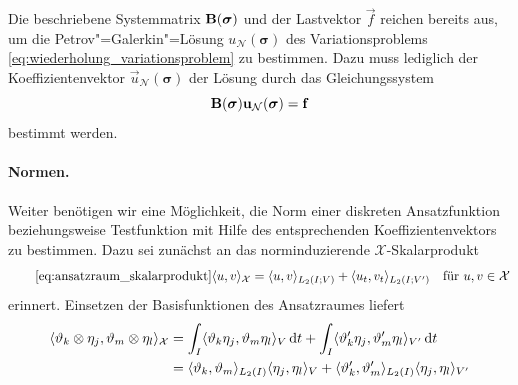 \documentclass[../main.tex]{subfiles}
\begin{document}
Die beschriebene Systemmatrix $\mathbf{B}(\bm \sigma)$ und der Lastvektor $\vec f$ reichen bereits aus, um die Petrov"=Galerkin"=Lösung $u_{\mathcal N}(\bm \sigma)$ des Variationsproblems \cref{eq:wiederholung_variationsproblem} zu bestimmen.
Dazu muss lediglich der Koeffizientenvektor $\vec{u}_{\mathcal N}(\bm \sigma)$ der Lösung durch das Gleichungssystem
\begin{equation}
    \mathbf{B}(\bm \sigma) \mathbf{u}_{\mathcal N}(\bm \sigma) = \mathbf{f}
\end{equation}
bestimmt werden.

\paragraph{Normen.} %
\label{par:normen}

Weiter benötigen wir eine Möglichkeit, die Norm einer diskreten Ansatzfunktion beziehungsweise Testfunktion mit Hilfe des entsprechenden Koeffizientenvektors zu bestimmen.
Dazu sei zunächst an das norminduzierende $\mathcal X$-Skalarprodukt
\begin{equation}
    \tag*{\cref{eq:ansatzraum_skalarprodukt}}
    \skp{u}{v}{\mathcal X} = \skp{u}{v}{L_{2}(I; V)} + \skp{u_t}{v_t}{L_2(I; V')} \quad \text{für } u, v \in \mathcal X
\end{equation}
erinnert.
Einsetzen der Basisfunktionen des Ansatzraumes liefert
\begin{align}
    \langle\vartheta_{k} \otimes \eta_{j},\vartheta_{m} \otimes \eta_{l}\rangle_{\mathcal X}
    &= \int_{I} \langle\vartheta_{k} \eta_{j},\vartheta_{m} \eta_{l}\rangle_{V} \mathop{}\!\mathrm{d} t
        + \int_{I} \langle\vartheta_{k}' \eta_{j},\vartheta_{m}' \eta_{l}\rangle_{V'} \mathop{}\!\mathrm{d} t
    \\&= \langle\vartheta_{k},\vartheta_{m}\rangle_{L_{2}(I)} \langle\eta_{j},\eta_{l}\rangle_{V} + \langle\vartheta_{k}',\vartheta_{m}'\rangle_{L_{2}(I)} \langle\eta_{j},\eta_{l}\rangle_{V'}
\end{align}
\end{document}
